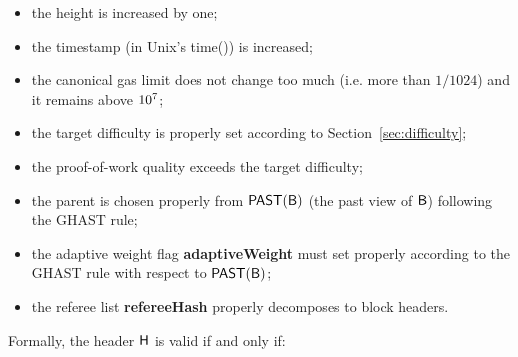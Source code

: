 \begin{itemize}[nosep]
	\item the height is increased by one;
	\item the timestamp (in Unix's time()) is increased;

	\item the canonical gas limit does not change too much (i.e. more than $1/1024$) and it remains above $10^7$;

	\item the target difficulty is properly set according to Section~\ref{sec:difficulty};

	\item the proof-of-work quality exceeds the target difficulty; 


	\item the parent is chosen properly from $\mathsf{PAST}(\textsf{B})$ (the past view of $\textsf{B}$) following the GHAST rule;

	\item the adaptive weight flag {\bf adaptiveWeight} must set properly according to the GHAST rule with respect to $\mathsf{PAST}(\textsf{B})$;




	\item the referee list {\bf refereeHash} properly decomposes to block headers.

\end{itemize}

\medskip

Formally, the header $\textsf{H}$ is valid if and only if: 


